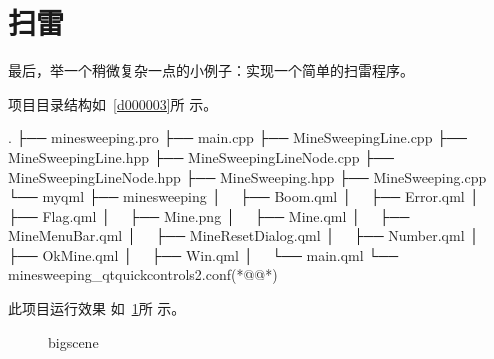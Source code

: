 ﻿




\FloatBarrier
\section{
扫雷
}\label{s100810t05}


最后，举一个稍微复杂一点的小例子：实现一个简单的扫雷程序。

项目目录结构如\treeindexnumbernameone\ \ref{d000003}所
示。

{}\label{d000003}    %
\begin{thebookfilesourceonepathtree}[escapeinside={(*@}{@*)},
caption=GoodLuck,
numbers=none,
title=\treeindexnumbernameone \thetreeindexnumber
]
.
├── minesweeping.pro
├── main.cpp
├── MineSweepingLine.cpp
├── MineSweepingLine.hpp
├── MineSweepingLineNode.cpp
├── MineSweepingLineNode.hpp
├── MineSweeping.hpp
├── MineSweeping.cpp
└── myqml
    ├── minesweeping
    │   ├── Boom.qml
    │   ├── Error.qml
    │   ├── Flag.qml
    │   ├── Mine.png
    │   ├── Mine.qml
    │   ├── MineMenuBar.qml
    │   ├── MineResetDialog.qml
    │   ├── Number.qml
    │   ├── OkMine.qml
    │   ├── Win.qml
    │   └── main.qml
    └── minesweeping_qtquickcontrols2.conf(*@\marginpar[\hfill\setlength\fboxsep{2pt}\fbox{\footnotesize{\kaishu\parbox{1em}{\setlength{\baselineskip}{2pt}\treeindexnumbernameone}}\footnotesize{\thetreeindexnumber}}]{\setlength\fboxsep{2pt}\fbox{\footnotesize{\kaishu\parbox{1em}{\setlength{\baselineskip}{2pt}\treeindexnumbernameone}}\footnotesize{\thetreeindexnumber}}}@*)\end{thebookfilesourceonepathtree}          %
\addtocounter{lstlisting}{-1}   %


此项目运行效果
如\figurename\ \ref{p000065}所
示。

\begin{figure}[htb] %
\marginnote{\setlength\fboxsep{2pt}\fbox{\footnotesize{\kaishu\figurename\,}\footnotesize{\ref{p000065}}}}\centering %
\setlength\fboxsep{0pt} %
\caption{bigscene} %
\label{p000065} %
\end{figure}


